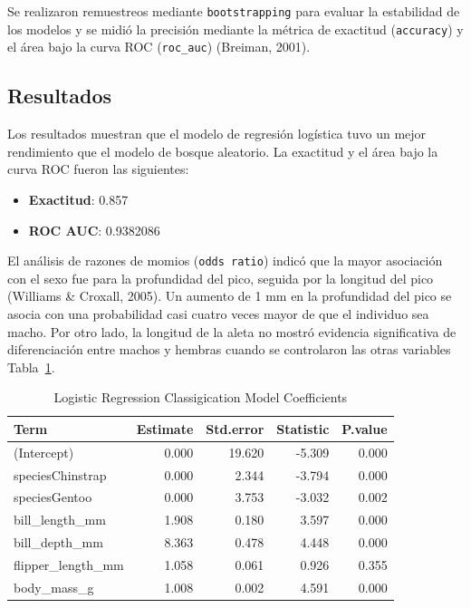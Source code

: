 \documentclass[
]{agujournal2019}
\providecommand{\tightlist}{%
  \setlength{\itemsep}{0pt}\setlength{\parskip}{0pt}}\usepackage{longtable,booktabs,array}
\begin{document}
Se realizaron remuestreos mediante \texttt{bootstrapping} para evaluar
la estabilidad de los modelos y se midió la precisión mediante la
métrica de exactitud (\texttt{accuracy}) y el área bajo la curva ROC
(\texttt{roc\_auc}) (Breiman, 2001).

\subsection{Resultados}\label{resultados}

Los resultados muestran que el modelo de regresión logística tuvo un
mejor rendimiento que el modelo de bosque aleatorio. La exactitud y el
área bajo la curva ROC fueron las siguientes:

\begin{itemize}
\tightlist
\item
  \textbf{Exactitud}: 0.857\\
\item
  \textbf{ROC AUC}: 0.9382086
\end{itemize}

El análisis de razones de momios (\texttt{odds\ ratio}) indicó que la
mayor asociación con el sexo fue para la profundidad del pico, seguida
por la longitud del pico (Williams \& Croxall, 2005). Un aumento de 1 mm
en la profundidad del pico se asocia con una probabilidad casi cuatro
veces mayor de que el individuo sea macho. Por otro lado, la longitud de
la aleta no mostró evidencia significativa de diferenciación entre
machos y hembras cuando se controlaron las otras variables
Tabla~\ref{tbl-res}.

\begin{longtable}[]{@{}lrrrr@{}}

\caption{\label{tbl-res}Logistic Regression Classigication Model
Coefficients}

\tabularnewline

\toprule\noalign{}
Term & Estimate & Std.error & Statistic & P.value \\
\midrule\noalign{}
\endhead
\bottomrule\noalign{}
\endlastfoot
(Intercept) & 0.000 & 19.620 & -5.309 & 0.000 \\
speciesChinstrap & 0.000 & 2.344 & -3.794 & 0.000 \\
speciesGentoo & 0.000 & 3.753 & -3.032 & 0.002 \\
bill\_length\_mm & 1.908 & 0.180 & 3.597 & 0.000 \\
bill\_depth\_mm & 8.363 & 0.478 & 4.448 & 0.000 \\
flipper\_length\_mm & 1.058 & 0.061 & 0.926 & 0.355 \\
body\_mass\_g & 1.008 & 0.002 & 4.591 & 0.000 \\

\end{longtable}
\end{document}
